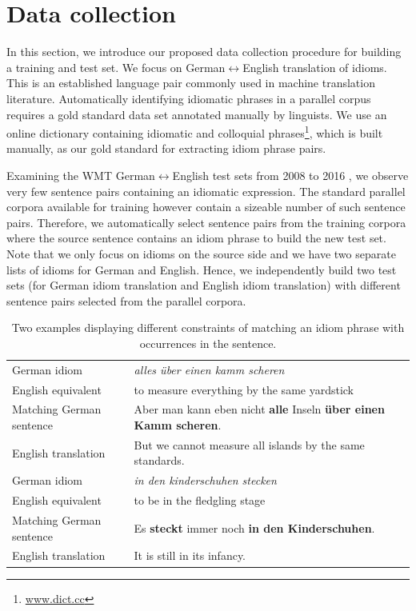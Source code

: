 \section{Data collection} \label{idiomdata}

In this section, we introduce our proposed data collection procedure for building a training and test set.
We focus on German$\leftrightarrow$English translation of idioms. 
This is an established language pair commonly used in machine translation literature.
Automatically identifying idiomatic phrases in a parallel corpus requires a gold standard data set annotated manually by linguists. 
We use an online dictionary containing idiomatic and colloquial phrases\footnote{\url{www.dict.cc}}, which is built manually, as our gold standard for extracting idiom phrase pairs. 

Examining the WMT German$\leftrightarrow$English test sets from 2008 to 2016 \citep{bojar-EtAl:2017:WMT1}, we observe very few sentence pairs containing an idiomatic expression. 
The standard parallel corpora available for training however contain a sizeable number of such sentence pairs.
Therefore, we automatically select sentence pairs from the training corpora where the source sentence contains an idiom phrase to build the new test set.
Note that we only focus on idioms on the source side and we have two separate lists of idioms for German and English.
Hence, we independently build two test sets (for German idiom translation and English idiom translation) with different sentence pairs selected from the parallel corpora.

 \begin{table}[htb!]
\centering
\small
\caption{Two examples displaying different constraints of matching an idiom phrase with occurrences in the sentence. \label{two}}
\begin{tabularx}{0.85\linewidth}{@{\ }l @{\ \ \ }X@{\ }}
 \toprule
German idiom & \textit{alles {\"u}ber einen kamm scheren}  \\
English equivalent & to measure everything by the same yardstick \\
Matching German sentence & Aber man kann eben nicht \textbf{alle} Inseln \textbf{\"{u}ber einen Kamm scheren}.\\
English translation &  But we cannot measure all islands by the same standards.\\ 
 \midrule
German idiom & \textit{in den kinderschuhen stecken}  \\
English equivalent & to be in the fledgling stage \\
Matching German sentence & Es \textbf{steckt} immer noch \textbf{in den Kinderschuhen}. \\
English translation &  It is still in its infancy. \\
\bottomrule
\end{tabularx}
\end{table}

